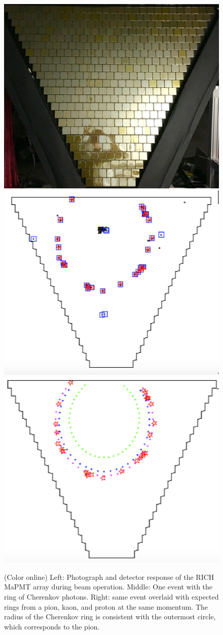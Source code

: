 \documentclass[final,3p,twocolumn]{elsarticle}
\begin{document}
\begin{figure}[ht!]
\centerline{\includegraphics[width=0.625\columnwidth]{rich1.png} 
\includegraphics[width=0.65\columnwidth]{rich2.png}
\includegraphics[width=0.64\columnwidth]{rich3.png} }
\caption{(Color online) Left: Photograph and detector response of the RICH MaPMT array during beam operation. Middle: One
  event with the ring of Cherenkov photons. Right: same event overlaid with expected rings from a pion, kaon, and proton
  at the same momentum. The radius of the Cherenkov ring is consistent with the outermost circle, which corresponds to the pion.}
\label{rich-event}
\end{figure}
\end{document}
